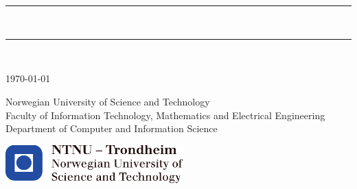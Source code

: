 \begin{titlepage}

\begin{center}
    
     
    ~\\[3.5cm]
    
    \LARGE \textbf{\myauthor}\\[1.5cm]
    
    \hrule ~\\[0.2cm]
    {\fontsize{60pt}{20pt}\selectfont\mytitle}	%
    \vspace{0.5cm}
    \hrule ~\\[0.2cm]
    
    
    \vspace{1.5cm}
\end{center}




\vfill


{\large \today}
\vspace{1.5cm} 

\large{Norwegian University of Science and Technology
\\[0.2cm]
Faculty of Information Technology, Mathematics and Electrical Engineering
\\[0.2cm]
Department of Computer and Information Science} 
\vspace{1.5cm} 


\includegraphics[height=1.5cm]{images/ntnu_logo.pdf} 

\end{titlepage}
